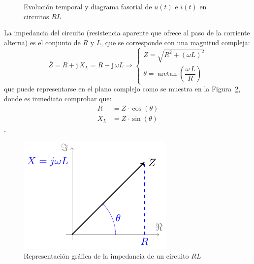 \documentclass[11pt]{book} %
\numberwithin{dummy}{section}
\theoremstyle{ocrenumbox}
\theoremstyle{blacknumex}
\theoremstyle{blacknumbox}
\theoremstyle{ocrenum}
\newlength\esp
\begin{document}
	\begin{figure}[htbp]
		\centering
		\hfil
		\caption{Evolución temporal y diagrama fasorial de $u(t)$ e $i(t)$ en circuitos $RL$}
		\label{fig.fasorInductanciaReal_VI}
	\end{figure}
	
	La impedancia del circuito (resistencia aparente que ofrece al paso de la corriente alterna) es el conjunto de $R$ y $L$, que se corresponde con una magnitud compleja: 
	\begin{equation}
		\boxed{ \overline{Z} = R + \mathrm{j}\,X_L = R+ \mathrm{j}\,\omega L \Rightarrow 
			\begin{cases}
				Z=\sqrt{R^2+(\omega L)^2}\\
				\theta=\arctan\left(\dfrac{\omega\,L}{R} \right)
		\end{cases}}
	\end{equation}
	que puede representarse en el plano complejo como se muestra en la Figura~\ref{fig.fasorinductanciareal}, donde es inmediato comprobar que:
	\begin{align*}
		R&=Z\cdot\cos(\theta)\\
		X_L&=Z\cdot\sin(\theta)
	\end{align*}. 
	\begin{figure}[htbp]
		\centering
		\includegraphics{../figs/fasorInductanciaReal.pdf}
		\caption{Representación gráfica de la impedancia de un circuito $RL$}
		\label{fig.fasorinductanciareal}
	\end{figure}
	
\end{document}
